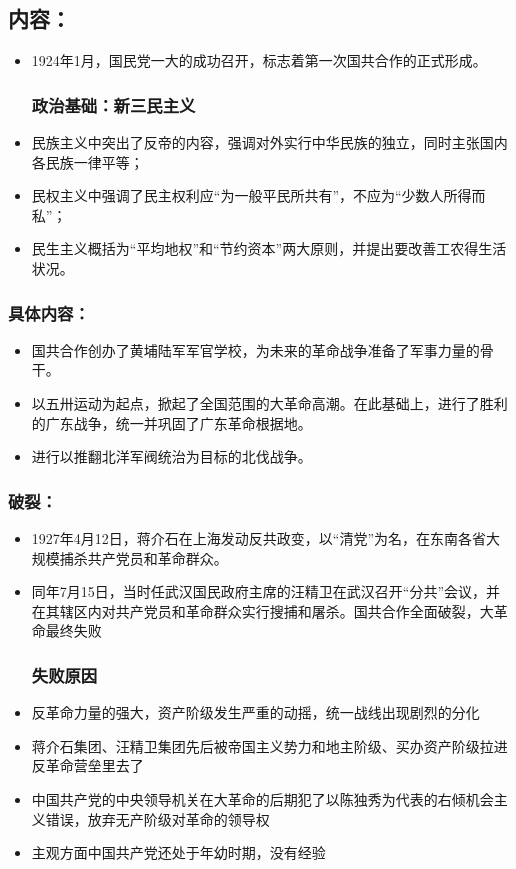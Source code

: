 \documentclass{article}
\begin{document}
\subsection*{内容：}
\begin{itemize}
 	\subsubsection*{形成标志:}
   \item 1924年1月，国民党一大的成功召开，标志着第一次国共合作的正式形成。
  \subsubsection*{政治基础：新三民主义}
    
        \item 民族主义中突出了反帝的内容，强调对外实行中华民族的独立，同时主张国内各民族一律平等；
        \item 民权主义中强调了民主权利应“为一般平民所共有”，不应为“少数人所得而私”；
        \item 民生主义概括为“平均地权”和“节约资本”两大原则，并提出要改善工农得生活状况。
  

\end{itemize}
\subsubsection*{具体内容：}
\begin{itemize}
    \item 国共合作创办了黄埔陆军军官学校，为未来的革命战争准备了军事力量的骨干。
    \item 以五卅运动为起点，掀起了全国范围的大革命高潮。在此基础上，进行了胜利的广东战争，统一并巩固了广东革命根据地。
    \item 进行以推翻北洋军阀统治为目标的北伐战争。
\end{itemize}
\subsubsection*{破裂：}
\begin{itemize}
    \item 1927年4月12日，蒋介石在上海发动反共政变，以“清党”为名，在东南各省大规模捕杀共产党员和革命群众。
    \item 同年7月15日，当时任武汉国民政府主席的汪精卫在武汉召开“分共”会议，并在其辖区内对共产党员和革命群众实行搜捕和屠杀。国共合作全面破裂，大革命最终失败
    \subsubsection*{失败原因}
     
        \item 反革命力量的强大，资产阶级发生严重的动摇，统一战线出现剧烈的分化
        \item 蒋介石集团、汪精卫集团先后被帝国主义势力和地主阶级、买办资产阶级拉进反革命营垒里去了
        \item 中国共产党的中央领导机关在大革命的后期犯了以陈独秀为代表的右倾机会主义错误，放弃无产阶级对革命的领导权
        \item 主观方面中国共产党还处于年幼时期，没有经验
    
\end{itemize}
\end{document}
